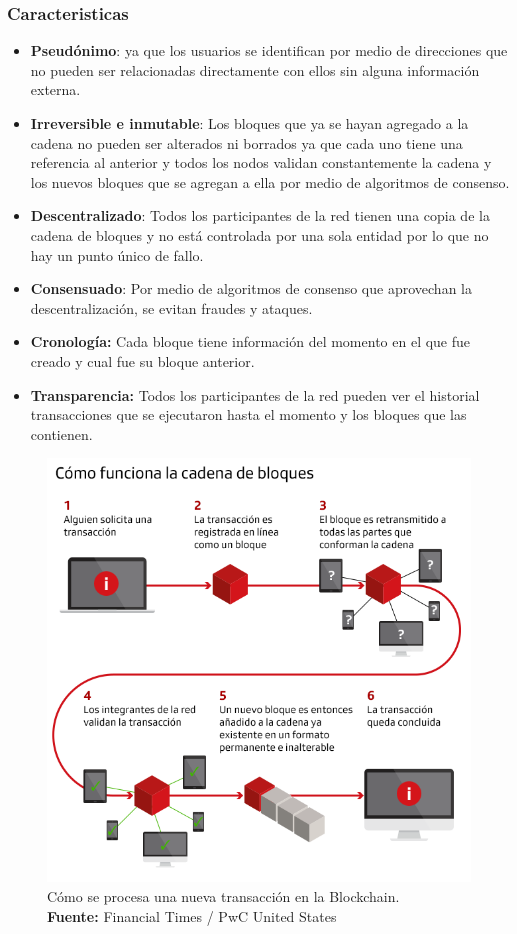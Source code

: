 \documentclass[
11pt, %
oneside, %
spanish, %
singlespacing, %
parskip, %
headsepline, %
chapterinoneline, %
]{MastersDoctoralThesis} %
\begin{document}
\subsubsection*{Caracteristicas}
\begin{itemize}
\item \textbf{Pseudónimo}: ya que los usuarios se identifican por medio de direcciones que no pueden ser relacionadas directamente con ellos sin alguna información externa.
\item \textbf{Irreversible e inmutable}: Los bloques que ya se hayan agregado a la cadena no pueden ser alterados ni borrados ya que cada uno tiene una referencia al anterior y todos los nodos validan constantemente la cadena y los nuevos bloques que se agregan a ella por medio de algoritmos de consenso.
\item \textbf{Descentralizado}: Todos los participantes de la red tienen una copia de la cadena de bloques y no está controlada por una sola entidad por lo que no hay un punto único de fallo.
\item \textbf{Consensuado}: Por medio de algoritmos de consenso que aprovechan la descentralización, se evitan fraudes y ataques.
\item \textbf{Cronología:} Cada bloque tiene información del momento en el que fue creado y cual fue su bloque anterior.
\item \textbf{Transparencia:} Todos los participantes de la red pueden ver el historial transacciones que se ejecutaron hasta el momento y los bloques que las contienen.
\end{itemize}

\begin{figure}[H]
  	\centering
	\includegraphics[scale=0.5]{imgs/blockchain-explained.png}
	\caption{Cómo se procesa una nueva transacción en la Blockchain. \\ \textbf{Fuente:} Financial Times / PwC United States}
	\label{fig:bc-exp}
\end{figure}
\end{document}
